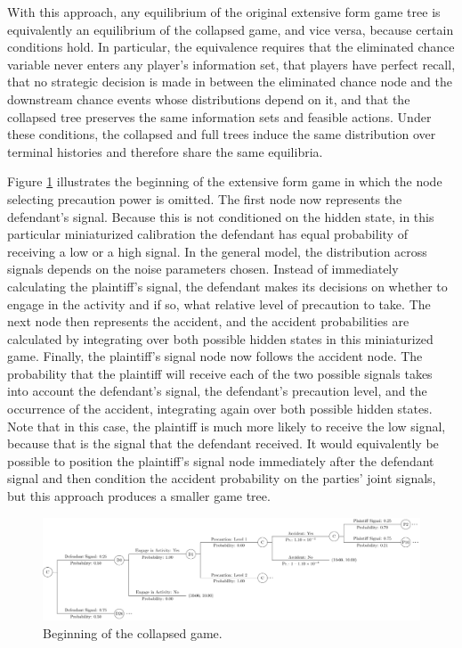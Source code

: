 \documentclass{article}
\begin{document}
With this approach, any equilibrium of the original extensive form game tree is equivalently an equilibrium of the collapsed game, and vice versa, because certain conditions hold. In particular, the equivalence requires that the eliminated chance variable never enters any player’s information set, that players have perfect recall, that no strategic decision is made in between the eliminated chance node and the downstream chance events whose distributions depend on it, and that the collapsed tree preserves the same information sets and feasible actions. Under these conditions, the collapsed and full trees induce the same distribution over terminal histories and therefore share the same equilibria.

Figure \ref{fig:smalltree_collapsed_beginning.pdf} illustrates the beginning of the extensive form game in which the node selecting precaution power is omitted. The first node now represents the defendant's signal. Because this is not conditioned on the hidden state, in this particular miniaturized calibration the defendant has equal probability of receiving a low or a high signal. In the general model, the distribution across signals depends on the noise parameters chosen. Instead of immediately calculating the plaintiff's signal, the defendant makes its decisions on whether to engage in the activity and if so, what relative level of precaution to take. The next node then represents the accident, and the accident probabilities are calculated by integrating over both possible hidden states in this miniaturized game. Finally, the plaintiff's signal node now follows the accident node. The probability that the plaintiff will receive each of the two possible signals takes into account the defendant's signal, the defendant's precaution level, and the occurrence of the accident, integrating again over both possible hidden states. Note that in this case, the plaintiff is much more likely to receive the low signal, because that is the signal that the defendant received. It would equivalently be possible to position the plaintiff's signal node immediately after the defendant signal and then condition the accident probability on the parties' joint signals, but this approach produces a smaller game tree.

  \begin{figure}[t]
    \centering
    \includegraphics[width=\textwidth]{../Figures/smalltree_collapsed_beginning.pdf}
    \caption{Beginning of the collapsed game.}
    \label{fig:smalltree_collapsed_beginning.pdf}
  \end{figure}
\end{document}
